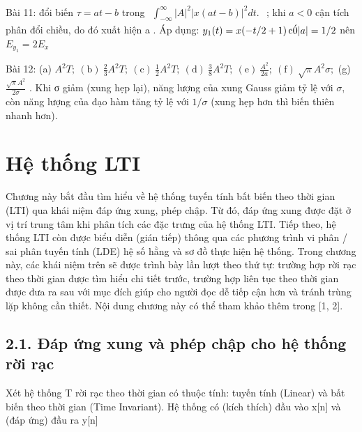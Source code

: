\documentclass[
  10
]{article}
\begin{document}
Bài 11: đổi biến \(\tau = a t - b\) trong
\(\begin{array} { r } { \int _ { - \infty } ^ { \infty } | A | ^ { 2 } | x ( a t - b ) | ^ { 2 } d t . } \end{array}\)
; khi \(a < 0\) cận tích phân đổi chiều, do đó xuất hiện a . Áp dụng:
\(y _ { 1 } ( t ) = x ( - t / 2 + 1 ) \thinspace \mathrm { c } \acute { 0 } \vert a \vert = 1 / 2\)
nên \(E _ { y _ { 1 } } = 2 E _ { x }\)

Bài 12: (a)
\(A ^ { 2 } T ; ~ ( \mathrm { b } ) ~ \textstyle { \frac { 2 } { 3 } } A ^ { 2 } T ; ~ ( \mathrm { c } ) ~ \textstyle { \frac { 1 } { 2 } } A ^ { 2 } T ; ~ ( \mathrm { d } ) ~ \textstyle { \frac { 3 } { 8 } } A ^ { 2 } T ; ~ ( \mathrm { e } ) ~ \textstyle { \frac { A ^ { 2 } } { 2 a } } ; { \mathrm {  ~ ( f ) ~ } } \sqrt { \pi } A ^ { 2 } \sigma ;\)
(g)
\(\textstyle { \frac { { \sqrt { \pi } } A ^ { 2 } } { 2 \sigma } }\) .
Khi σ giảm (xung hẹp lại), năng lượng của xung Gauss giảm tỷ lệ với
\(\sigma ,\) còn năng lượng của đạo hàm tăng tỷ lệ với \(1 / \sigma\)
(xung hẹp hơn thì biến thiên nhanh hơn).

\section{Hệ thống LTI}\label{hux1ec7-thux1ed1ng-lti}

Chương này bắt đầu tìm hiểu về hệ thống tuyến tính bất biến theo thời
gian (LTI) qua khái niệm đáp ứng xung, phép chập. Từ đó, đáp ứng xung
được đặt ở vị trí trung tâm khi phân tích các đặc trưng của hệ thống
LTI. Tiếp theo, hệ thống LTI còn được biểu diễn (gián tiếp) thông qua
các phương trình vi phân / sai phân tuyến tính (LDE) hệ số hằng và sơ đồ
thực hiện hệ thống. Trong chương này, các khái niệm trên sẽ được trình
bày lần lượt theo thứ tự: trường hợp rời rạc theo thời gian được tìm
hiểu chi tiết trước, trường hợp liên tục theo thời gian được đưa ra sau
với mục đích giúp cho người đọc dễ tiếp cận hơn và tránh trùng lặp không
cần thiết. Nội dung chương này có thể tham khảo thêm trong {[}1, 2{]}.

\subsection{2.1. Đáp ứng xung và phép chập cho hệ thống rời
rạc}\label{ux111uxe1p-ux1ee9ng-xung-vuxe0-phuxe9p-chux1eadp-cho-hux1ec7-thux1ed1ng-rux1eddi-rux1ea1c}

Xét hệ thống T rời rạc theo thời gian có thuộc tính: tuyến tính (Linear)
và bất biến theo thời gian (Time Invariant). Hệ thống có (kích thích)
đầu vào x{[}n{]} và (đáp ứng) đầu ra y{[}n{]}
\end{document}
